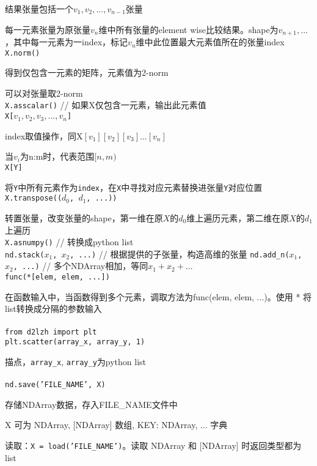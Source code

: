 \documentclass[UTF8]{ctexart}
\begin{document}
  \quad 结果张量包括一个$v_1, v_2, ..., v_{n-1}$张量

  \quad 每一元素张量为原张量$v_n$维中所有张量的element wise比较结果。shape为$v_{n+1}, ...$，其中每一元素为一index，标记$v_n$维中此位置最大元素值所在的张量index\\
\texttt{X.norm()}
 
  得到仅包含一元素的矩阵，元素值为2-norm

  可以对张量取2-norm\\
\texttt{X.asscalar()} // 如果X仅包含一元素，输出此元素值\\
\texttt{X[$v_1, v_2, v_3, ..., v_n$]}

  index取值操作，同X$[v_1][v_2][v_3]...[v_n]$

  当$v_i$为n:m时，代表范围$[n, m)$\\
\texttt{X[Y]}

  将\texttt{Y}中所有元素作为\texttt{index}，在\texttt{X}中寻找对应元素替换进张量\texttt{Y}对应位置\\
\texttt{X.transpose(($d_0$, $d_1$, ...))}

  转置张量，改变张量的shape，第一维在原$X$的$d_0$维上遍历元素，第二维在原$X$的$d_1$上遍历\\
\texttt{X.asnumpy()} // 转换成python list\\
\texttt{nd.stack($x_1$, $x_2$, ...)} // 根据提供的子张量，构造高维的张量
\texttt{nd.add\_n($x_1$, $x_2$, ...)} // 多个NDArray相加，等同$x_1 + x_2 + ...$\\
\texttt{func(*[elem, elem, ...])}

  在函数输入中，当函数得到多个元素，调取方法为func(elem, elem, ...)。使用 * 将list转换成分隔的参数输入\\\\
\texttt{from d2lzh import plt}\\
\texttt{plt.scatter(array\_x, array\_y, 1)}

  描点，\texttt{array\_x}, \texttt{array\_y}为python list\\\\
\texttt{nd.save('FILE\_NAME', X)}

  存储NDArray数据，存入FILE\_NAME文件中

  X 可为 NDArray, [NDArray] 数组, {KEY: NDArray, ...} 字典
  
  读取：\texttt{X = load('FILE\_NAME')}。读取 NDArray 和 [NDArray] 时返回类型都为list

\end{document}
